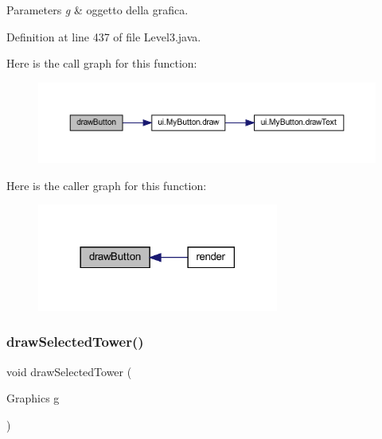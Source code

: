 \begin{DoxyParams}{Parameters}
{\em g} & oggetto della grafica. \\
\hline
\end{DoxyParams}


Definition at line 437 of file Level3.\+java.

Here is the call graph for this function\+:\nopagebreak
\begin{figure}[H]
\begin{center}
\leavevmode
\includegraphics[width=350pt]{classscenes_1_1_level3_a65768678909bc0512c6cb9780709ad38_cgraph}
\end{center}
\end{figure}
Here is the caller graph for this function\+:\nopagebreak
\begin{figure}[H]
\begin{center}
\leavevmode
\includegraphics[width=225pt]{classscenes_1_1_level3_a65768678909bc0512c6cb9780709ad38_icgraph}
\end{center}
\end{figure}
\mbox{\label{classscenes_1_1_level3_a0a97d0bb6d32640b2ae351707946abf7}} 
\subsubsection{\texorpdfstring{draw\+Selected\+Tower()}{drawSelectedTower()}}
{\footnotesize\ttfamily void draw\+Selected\+Tower (\begin{DoxyParamCaption}\item[{Graphics}]{g }\end{DoxyParamCaption})\hspace{0.3cm}{\ttfamily [private]}}



